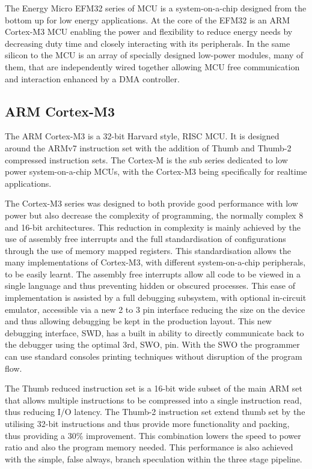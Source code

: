The Energy Micro EFM32 series of \ac{MCU} is a system-on-a-chip designed from the bottom
up for low energy applications. At the core of the EFM32 is an ARM Cortex-M3 \ac{MCU} enabling the
power and flexibility to reduce energy needs by decreasing duty time and closely interacting with its
peripherals. In the same silicon to the \ac{MCU} is an array of specially designed low-power modules,
many of them, that are independently wired together allowing \ac{MCU} free communication and
interaction enhanced by a \ac{DMA} controller.

\subsection{ARM Cortex-M3}
The ARM Cortex-M3 is a 32-bit Harvard style, \ac{RISC} \ac{MCU}. It is designed
around the ARMv7 instruction set with the addition of Thumb
and Thumb-2 compressed instruction sets. The Cortex-M is the sub series dedicated to low power
system-on-a-chip \acp{MCU}, with the Cortex-M3 being specifically for realtime applications.


The Cortex-M3 series was designed to both provide good performance with low power but also
decrease the complexity of programming, the normally complex 8 and 16-bit architectures. This
reduction in complexity is mainly achieved by the use of assembly free interrupts and the full
standardisation of configurations through the use of memory mapped registers. This standardisation
allows the many implementations of Cortex-M3, with different system-on-a-chip peripherals, to be
easily learnt. The assembly free interrupts allow all code to be viewed in a single language and thus
preventing hidden or obscured processes. This ease of implementation is assisted by a full debugging
subsystem, with optional in-circuit emulator, accessible via a new 2 to 3 pin interface reducing the
size on the device and thus allowing debugging be kept in the production layout. This new debugging
interface, \ac{SWD}, has a built in ability to directly communicate back to the
debugger using the optimal 3rd, \ac{SWO}, pin. With the \ac{SWO} the programmer can use
standard consoles printing techniques without disruption of the program flow.


The Thumb reduced instruction set is a 16-bit wide subset of the main ARM set that allows multiple
instructions to be compressed into a single instruction read, thus reducing \ac{I/O} latency. The Thumb-2
instruction set extend thumb set by the utilising 32-bit instructions and thus provide more
functionality and packing, thus providing a 30\% improvement. This combination lowers the speed to
power ratio and also the program memory needed. This performance is also achieved with the
simple, false always, branch speculation within the three stage pipeline.


